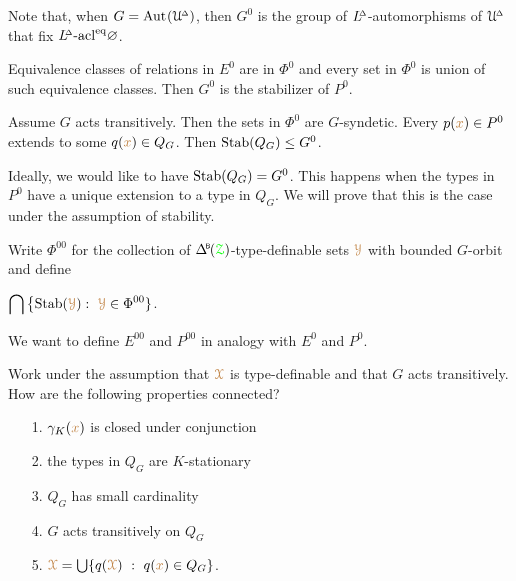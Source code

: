 Note that, when $G={\rm Aut\kern.15ex}(\EuScript U\kern-.2ex^{\scriptscriptstyle\Delta})$, then $G^0$ is the group of $L\kern-.5ex^{\scriptscriptstyle\Delta}$-automorphisms of $\EuScript U\kern-.2ex^{\scriptscriptstyle\Delta}$ that fix $L\kern-.5ex^{\scriptscriptstyle\Delta}\mbox-{\rm acl}^{{\rm eq}}\varnothing$.%

\begin{remark}\label{lem_trans_action}
  Equivalence classes of relations in $E^0$ are in $\Phi^0$ and every set in $\Phi^0$ is union of such equivalence classes.
  Then $G^0$ is the stabilizer of $P^0$.\smallskip

  Assume $G$ acts transitively.
  Then the sets in $\Phi^0$ are $G$-syndetic.
  Every $p({\color{brown} x})\in P^0$ extends to some $q({\color{brown} x})\in Q_G$.
  Then ${\rm Stab}(Q_G)\le G^0$.
\end{remark}


Ideally, we would like to have ${\rm Stab}(Q_G)=G^0$.
This happens when the types in $P^0$ have a unique extension to a type in $Q_G$.
We will prove that this is the case under the assumption of stability.


\begin{definition}\label{def_G00}
  Write \emph{$\Phi^{00}$\/} for the collection of $\BDelta(\grZ)$-type-definable sets ${\color{brown}\EuScript Y}$ with bounded $G$-orbit and define\smallskip

  \medrel{=}$\displaystyle\bigcap\big\{{\rm Stab}({\color{brown}\EuScript Y}) :\  {\color{brown}\EuScript Y}\in\Phi^{00}\}$.
\end{definition}

We want to define $E^{00}$ and $P^{00}$ in analogy with $E^0$ and $P^0$.

\begin{question}
  Work under the assumption that ${\color{brown}\EuScript X}$ is type-definable and that $G$ acts transitively.
  How are the following properties connected?
  \begin{itemize}
    \item [1.] $\gamma_K({\color{brown} x})$ is closed under conjunction
    \item [2.] the types in $Q_G$ are $K$-stationary
    \item [3.] $Q_G$ has small cardinality
    \item [4.] $G$ acts transitively on $Q_G$
    \item [5.] ${\color{brown}\EuScript X}=\bigcup\{q({\color{brown}\EuScript X})\ :\ q({\color{brown} x})\in Q_G\}$.
  \end{itemize}
\end{question}

